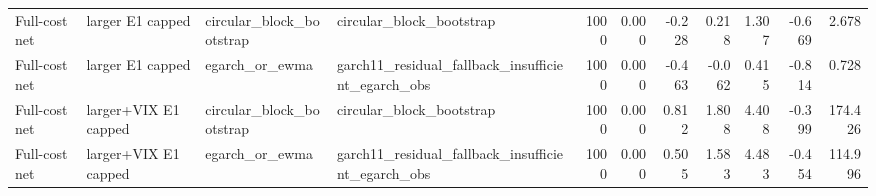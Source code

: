 \begin{tabular}{llllrrrrrrr}
Full-cost net & larger E1 capped & circular\_block\_bootstrap & circular\_block\_bootstrap & 1000 & 0.000 & -0.228 & 0.218 & 1.307 & -0.669 & 2.678 \\
Full-cost net & larger E1 capped & egarch\_or\_ewma & garch11\_residual\_fallback\_insufficient\_egarch\_obs & 1000 & 0.000 & -0.463 & -0.062 & 0.415 & -0.814 & 0.728 \\
Full-cost net & larger+VIX E1 capped & circular\_block\_bootstrap & circular\_block\_bootstrap & 1000 & 0.000 & 0.812 & 1.808 & 4.408 & -0.399 & 174.426 \\
Full-cost net & larger+VIX E1 capped & egarch\_or\_ewma & garch11\_residual\_fallback\_insufficient\_egarch\_obs & 1000 & 0.000 & 0.505 & 1.583 & 4.483 & -0.454 & 114.996 \\
\bottomrule
\end{tabular}
